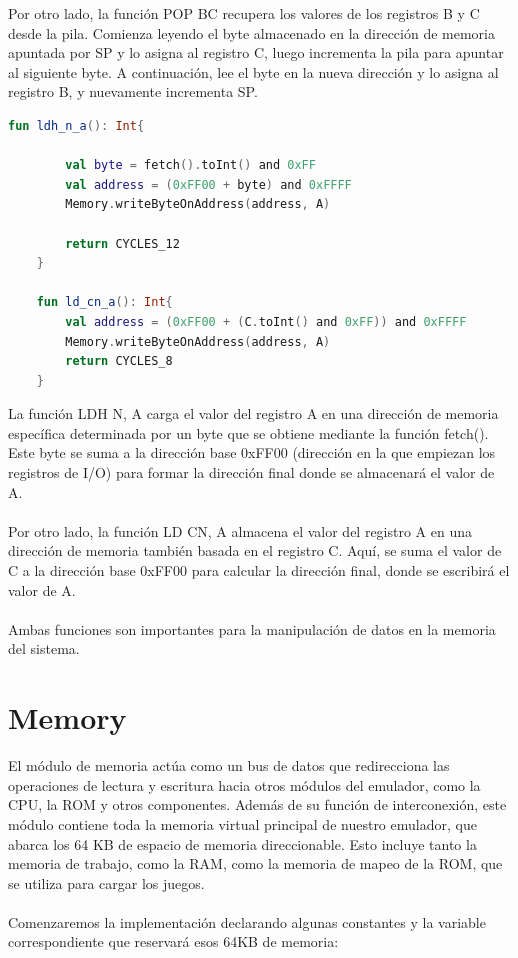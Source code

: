 Por otro lado, la función POP BC recupera los valores de los registros B y C desde la pila. Comienza leyendo el byte almacenado en la dirección de memoria apuntada por SP y lo asigna al registro C, luego incrementa la pila para apuntar al siguiente byte. A continuación, lee el byte en la nueva dirección y lo asigna al registro B, y nuevamente incrementa SP.

\begin{lstlisting}[language=Kotlin, caption={Operaciones I/O}, label={code:kotlinio}]
    fun ldh_n_a(): Int{

        val byte = fetch().toInt() and 0xFF
        val address = (0xFF00 + byte) and 0xFFFF
        Memory.writeByteOnAddress(address, A)

        return CYCLES_12
    }

    fun ld_cn_a(): Int{
        val address = (0xFF00 + (C.toInt() and 0xFF)) and 0xFFFF
        Memory.writeByteOnAddress(address, A)
        return CYCLES_8
    }
\end{lstlisting}

La función LDH N, A carga el valor del registro A en una dirección de memoria específica determinada por un byte que se obtiene mediante la función fetch(). Este byte se suma a la dirección base 0xFF00 (dirección en la que empiezan los registros de I/O) para formar la dirección final donde se almacenará el valor de A.
\\\\
Por otro lado, la función LD CN, A almacena el valor del registro A en una dirección de memoria también basada en el registro C. Aquí, se suma el valor de C a la dirección base 0xFF00 para calcular la dirección final, donde se escribirá el valor de A.
\\\\
Ambas funciones son importantes para la manipulación de datos en la memoria del sistema.

\section{Memory}
El módulo de memoria actúa como un bus de datos que redirecciona las operaciones de lectura y escritura hacia otros módulos del emulador, como la CPU, la ROM y otros componentes. Además de su función de interconexión, este módulo contiene toda la memoria virtual principal de nuestro emulador, que abarca los 64 KB de espacio de memoria direccionable. Esto incluye tanto la memoria de trabajo, como la RAM, como la memoria de mapeo de la ROM, que se utiliza para cargar los juegos.
\\\\
Comenzaremos la implementación declarando algunas constantes y la variable correspondiente que reservará esos 64KB de memoria:

